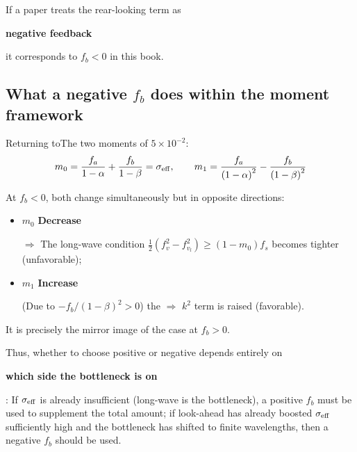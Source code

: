 \documentclass[11pt,a4paper,openany]{book}
\numberwithin{equation}{chapter}
\numberwithin{figure}{chapter}
\numberwithin{table}{chapter}
\begin{document}
If a paper treats the rear-looking term as

\textbf{negative feedback}

it corresponds to $f_b<0$ in this book.



\subsection{What a negative $f_b$ does within the moment framework}



Returning toThe two moments of $5\times10^{-2}$:
\begin{equation}
m_0 = \frac{f_a}{1-\alpha}+\frac{f_b}{1-\beta} = \sigma_{\rm eff},
\qquad
m_1 = \frac{f_a}{\left(1-\alpha\right)^2} - \frac{f_b}{\left(1-\beta\right)^2}
\end{equation}

At $f_b<0$, both change simultaneously but in opposite directions:



\begin{tcolorbox}[keybox,title=\textbf{Negative look-back = trading long-wave margin for finite-wavelength margin}]
\begin{itemize}[leftmargin=1.2em,itemsep=3pt]
\item $m_0$ \textbf{Decrease}

$\Rightarrow$ The long-wave condition $\tfrac12(f_v^2-f_{v_l}^2)\ge(1-m_0)f_s$ becomes tighter (unfavorable);


\item $m_1$ \textbf{Increase}

(Due to $-f_b/(1-\beta)^2>0$) the $\Rightarrow$ $k^2$ term is raised (favorable).


\end{itemize}


It is precisely the mirror image of the case at $f_b>0$.


\end{tcolorbox}



Thus, whether to choose positive or negative depends entirely on

\textbf{which side the bottleneck is on}

: If $\sigma_{\rm eff}$ is already insufficient (long-wave is the bottleneck), a positive $f_b$ must be used to supplement the total amount; if look-ahead has already boosted $\sigma_{\rm eff}$ sufficiently high and the bottleneck has shifted to finite wavelengths, then a negative $f_b$ should be used.
\end{document}
